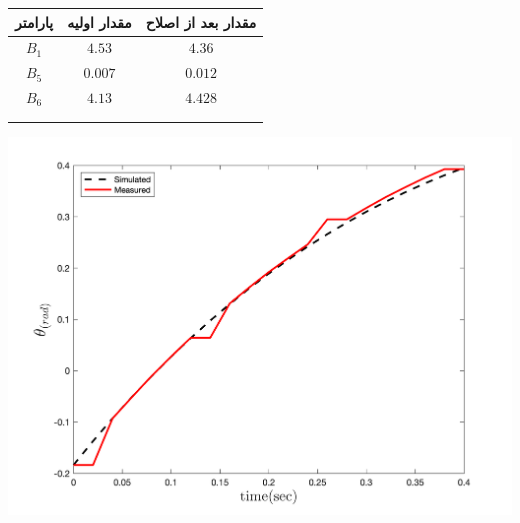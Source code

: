   \begin{minipage}[H]{\linewidth}
	\hfill
	\begin{minipage}[b]{0.49\linewidth}
		\centering
		\begin{tabular}{ccc}\hline
			پارامتر & مقدار اولیه  & مقدار بعد از اصلاح
			\\ \hline
			$B_1$  & $4.53$ & $4.36$ \\
			$B_5$ & $0.007$ & $0.012$\\
			$B_6$ & $4.13$ & $4.428$\\ \hline
			\\\\
		\end{tabular}
	\end{minipage}
	\begin{minipage}[b]{0.48\linewidth}
		\centering
		\includegraphics[width=1\linewidth]{../Figures/RCP/pitch_ml_parameter_estimation/RCP_pitch_S1.png}
	\end{minipage}
\end{minipage}

